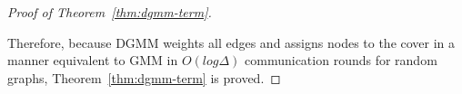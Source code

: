 \begin{proof}[Proof of Theorem~\ref{thm:dgmm-term}]
\label{prf:correct}




Therefore, because DGMM weights all edges and assigns nodes to the cover in a manner equivalent to GMM in $O(log \Delta)$ communication rounds for random graphs, Theorem~\ref{thm:dgmm-term} is proved. 
\end{proof}
